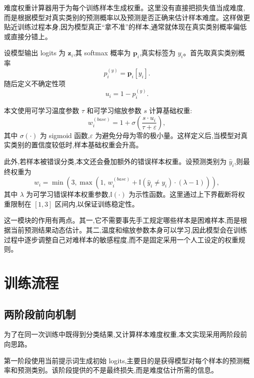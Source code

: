 难度权重计算器用于为每个训练样本生成权重。这里没有直接把损失值当成难度,而是根据模型对真实类别的预测概率以及预测是否正确来估计样本难度。这样做更贴近训练过程本身,因为模型真正“拿不准”的样本,通常就体现在真实类别概率偏低或直接分错上。

设模型输出 logits 为 \(\mathbf{z}_i\),其 softmax 概率为 \(\mathbf{p}_i\),真实标签为 \(y_i\)。首先取真实类别概率
\begin{equation}
p_i^{(y)} = \mathbf{p}_i[y_i].
\end{equation}
随后定义不确定性项
\begin{equation}
u_i = 1 - p_i^{(y)}.
\end{equation}

本文使用可学习温度参数 \(\tau\) 和可学习缩放参数 \(s\) 计算基础权重:
\begin{equation}
w_i^{(base)} = 1 + \sigma\left(\frac{s \cdot u_i}{\tau + \varepsilon}\right),
\end{equation}
其中 \(\sigma(\cdot)\) 为 sigmoid 函数,\(\varepsilon\) 为避免分母为零的极小量。这样定义后,当模型对真实类别的置信度较低时,样本基础权重会升高。

此外,若样本被错误分类,本文还会叠加额外的错误样本权重。设预测类别为 \(\hat{y}_i\),则最终权重为
\begin{equation}
w_i = \min \left( 3,\max \left( 1,\, w_i^{(base)} + \mathbb{I}(\hat{y}_i \neq y_i)\cdot(\lambda - 1) \right) \right),
\end{equation}
其中 \(\lambda\) 为可学习错误样本权重参数,\(\mathbb{I}(\cdot)\) 为示性函数。这里通过上下界截断将权重限制在 \([1,3]\) 区间内,以保证训练稳定性。

这一模块的作用有两点。其一,它不需要事先手工规定哪些样本是困难样本,而是根据当前预测结果动态估计。其二,温度和缩放参数本身可以学习,因此模型会在训练过程中逐步调整自己对难样本的敏感程度,而不是固定采用一个人工设定的权重规则。

\section{训练流程}

\subsection{两阶段前向机制}

为了在同一次训练中既得到分类结果,又计算样本难度权重,本文实现采用两阶段前向思路。

第一阶段使用当前提示词生成初始 logits,主要目的是获得模型对每个样本的预测概率和预测类别。该阶段提供的不是最终损失,而是难度估计所需的信息。

